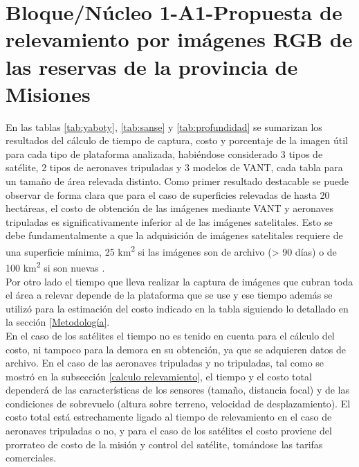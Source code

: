 

\color{black} 
\section {Bloque/Núcleo 1-A1-Propuesta de relevamiento por imágenes RGB de las reservas de la provincia de Misiones}


En las tablas \ref{tab:yaboty}, \ref{tab:sanse} y \ref{tab:profundidad} se sumarizan los resultados del cálculo de tiempo de captura, costo y porcentaje de la imagen útil para cada tipo de plataforma analizada, habiéndose considerado 3 tipos de satélite, 2 tipos de aeronaves tripuladas y 3 modelos de VANT, cada tabla para un tamaño de área relevada distinto. Como primer resultado destacable se puede observar de forma clara que para el caso de superficies relevadas de hasta 20 hectáreas, el costo de obtención de las imágenes mediante VANT y aeronaves tripuladas es significativamente inferior al de las imágenes satelitales. Esto se debe fundamentalmente a que la adquisición de imágenes satelitales requiere de una superficie mínima, 25 km\textsuperscript{2} si las imágenes son de archivo (> 90 días) o de 100 km\textsuperscript{2} si son nuevas \cite{noauthor_satellite_2020}. \\
Por otro lado el tiempo que lleva realizar la captura de imágenes que cubran toda el área a relevar depende de la plataforma que se use y ese tiempo además se utilizó para la estimación del costo indicado en la tabla siguiendo lo detallado en la sección \ref{Metodología}. \\
En el caso de los satélites el tiempo no es tenido en cuenta para el cálculo del costo, ni tampoco para la demora en su obtención, ya que se adquieren datos de archivo. En el caso de las aeronaves tripuladas y no tripuladas, tal como se mostró en la subsección \ref{calculo relevamiento}, el tiempo y el costo total dependerá de las características de los sensores (tamaño, distancia focal) y de las condiciones de sobrevuelo (altura sobre terreno, velocidad de desplazamiento). El costo total está estrechamente ligado al tiempo de relevamiento en el caso de aeronaves tripuladas o no, y para el caso de los satélites el costo proviene del prorrateo de costo de la misión y control del satélite, tomándose las tarifas comerciales.\\

